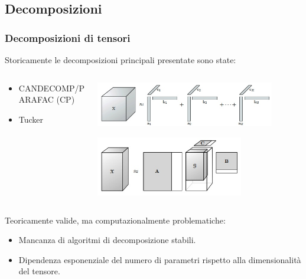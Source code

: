 \documentclass[compress]{beamer}
\theoremstyle{definition}
\theoremstyle{plain}
\begin{document}
\subsection{Decomposizioni}
\begin{frame}
\frametitle{Decomposizioni di tensori}
Storicamente le decomposizioni principali presentate sono state: 

\vspace{5mm}
\begin{columns}
\begin{column}{0.6\textwidth}
\begin{itemize}
\item CANDECOMP/PARAFAC (CP) %
	\vspace{3mm}
\item Tucker
\end{itemize}
\end{column}
\begin{column}{0.4\textwidth}
\includegraphics[width=0.85\textwidth]{Img/cp.jpg}

\includegraphics[width=0.7\textwidth]{Img/tucker.jpg}
\end{column}
\end{columns}

\vspace{5mm}
Teoricamente valide, ma computazionalmente problematiche:
\begin{itemize}
	\item Mancanza di algoritmi di decomposizione stabili.
	\item Dipendenza esponenziale del numero di parametri rispetto alla dimensionalità del tensore.
\end{itemize}
\end{frame}
\end{document}
